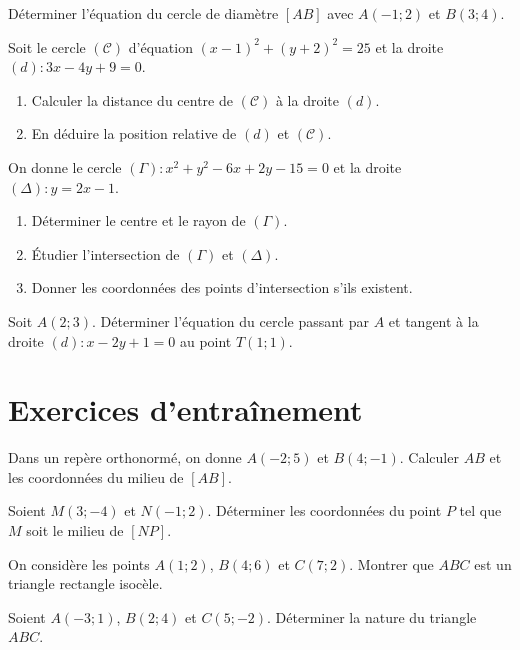 \exo{}
Déterminer l'équation du cercle de diamètre $[AB]$ avec $A(-1; 2)$ et $B(3; 4)$.


\exo{}
Soit le cercle $(\mathcal{C})$ d'équation $(x-1)^2 + (y+2)^2 = 25$ et la droite $(d) : 3x - 4y + 9 = 0$.
\begin{enumerate}[label=\alph*)]
    \item Calculer la distance du centre de $(\mathcal{C})$ à la droite $(d)$.
    \item En déduire la position relative de $(d)$ et $(\mathcal{C})$.
\end{enumerate}

\exo{}
On donne le cercle $(\Gamma) : x^2 + y^2 - 6x + 2y - 15 = 0$ et la droite $(\Delta) : y = 2x - 1$.
\begin{enumerate}[label=\alph*)]
    \item Déterminer le centre et le rayon de $(\Gamma)$.
    \item Étudier l'intersection de $(\Gamma)$ et $(\Delta)$.
    \item Donner les coordonnées des points d'intersection s'ils existent.
\end{enumerate}

\exo{}
Soit $A(2; 3)$. Déterminer l'équation du cercle passant par $A$ et tangent à la droite $(d) : x - 2y + 1 = 0$ au point $T(1; 1)$.

\section{Exercices d'entraînement}


\exo{}
Dans un repère orthonormé, on donne $A(-2; 5)$ et $B(4; -1)$. Calculer $AB$ et les coordonnées du milieu de $[AB]$.

\exo{}
Soient $M(3; -4)$ et $N(-1; 2)$. Déterminer les coordonnées du point $P$ tel que $M$ soit le milieu de $[NP]$.

\exo{}
On considère les points $A(1; 2)$, $B(4; 6)$ et $C(7; 2)$. Montrer que $ABC$ est un triangle rectangle isocèle.

\exo{}
Soient $A(-3; 1)$, $B(2; 4)$ et $C(5; -2)$. Déterminer la nature du triangle $ABC$.


